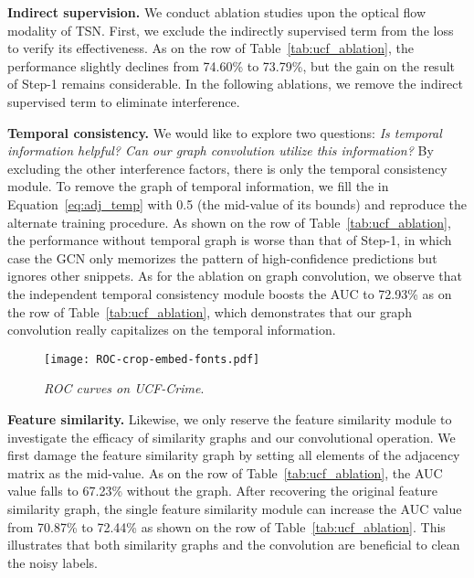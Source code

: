 \documentclass[10pt,twocolumn,letterpaper]{article}
\begin{document}
\textbf{Indirect supervision.}
We conduct ablation studies upon the optical flow modality of TSN. First, we exclude the indirectly supervised term from the loss to verify its effectiveness. As on the  row of Table~\ref{tab:ucf_ablation}, the performance slightly declines from 74.60\% to 73.79\%, but the gain on the result of Step-1 remains considerable. In the following ablations, we remove the indirect supervised term to eliminate interference.

\textbf{Temporal consistency.}
We would like to explore two questions: \emph{Is temporal information helpful? Can our graph convolution utilize this information?} By excluding the other interference factors, there is only the temporal consistency module. To remove the graph of temporal information, we fill the  in Equation~\ref{eq:adj_temp} with 0.5 (the mid-value of its bounds) and reproduce the alternate training procedure. As shown on the  row of Table~\ref{tab:ucf_ablation}, the performance without temporal graph is worse than that of Step-1, in which case the GCN only memorizes the pattern of high-confidence predictions but ignores other snippets. As for the ablation on graph convolution, we observe that the independent temporal consistency module boosts the AUC to 72.93\% as on the  row of Table~\ref{tab:ucf_ablation}, which demonstrates that our graph convolution really capitalizes on the temporal information.

\begin{figure}[!ht]
\centering
\texttt{[image: ROC-crop-embed-fonts.pdf]}
\caption{\emph{ROC curves on UCF-Crime}.}
\label{fig:ucf_roc}
\end{figure}

\textbf{Feature similarity.} Likewise, we only reserve the feature similarity module to investigate the efficacy of similarity graphs and our convolutional operation. We first damage the feature similarity graph by setting all elements of the adjacency matrix as the mid-value. As on the  row of Table~\ref{tab:ucf_ablation}, the AUC value falls to 67.23\% without the graph. After recovering the original feature similarity graph, the single feature similarity module can increase the AUC value from 70.87\% to 72.44\% as shown on the  row of Table~\ref{tab:ucf_ablation}. This illustrates that both similarity graphs and the convolution are beneficial to clean the noisy labels.
\end{document}
